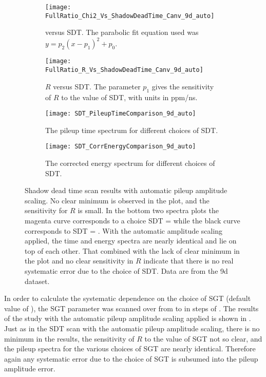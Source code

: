 \begin{figure}
\centering
    \begin{subfigure}[t]{0.45\textwidth}
        \centering
        \texttt{[image: FullRatio\_Chi2\_Vs\_ShadowDeadTime\_Canv\_9d\_auto]}
        \caption{\chisq versus SDT. The parabolic fit equation used was $y = p_{2}(x - p_{1})^{2} + p_{0}.$}
    \end{subfigure}%
    \hspace{1cm}
    \begin{subfigure}[t]{0.45\textwidth}
        \centering
        \texttt{[image: FullRatio\_R\_Vs\_ShadowDeadTime\_Canv\_9d\_auto]}
        \caption{$R$ versus SDT. The parameter $p_{1}$ gives the sensitivity of $R$ to the value of SDT, with units in ppm/ns.}
    \end{subfigure}

    \begin{subfigure}[t]{0.45\textwidth}
        \centering
        \texttt{[image: SDT\_PileupTimeComparison\_9d\_auto]}
        \caption{The pileup time spectrum for different choices of SDT.}
    \end{subfigure}%
    \hspace{1cm}
    \begin{subfigure}[t]{0.45\textwidth}
        \centering
        \texttt{[image: SDT\_CorrEnergyComparison\_9d\_auto]}
        \caption{The corrected energy spectrum for different choices of SDT.}
    \end{subfigure}
\caption[Pileup shadow dead time scan with automatic pileup amplitude scaling]{Shadow dead time scan results with automatic pileup amplitude scaling. No clear minimum is observed in the \chisq plot, and the sensitivity for $R$ is small. In the bottom two spectra plots the magenta curve corresponds to a choice SDT =  while the black curve corresponds to SDT = . With the automatic amplitude scaling applied, the time and energy spectra are nearly identical and lie on top of each other. That combined with the lack of clear minimum in the \chisq plot and no clear sensitivity in $R$ indicate that there is no real systematic error due to the choice of SDT. Data are from the 9d dataset.}
\label{fig:SDTscan_autoScaling}
\end{figure}


In order to calculate the systematic dependence on the choice of SGT (default value of ), the SGT parameter was scanned over from  to  in steps of . The results of the study with the automatic pileup amplitude scaling applied is shown in . Just as in the SDT scan with the automatic pileup amplitude scaling, there is no minimum in the \chisq results, the sensitivity of $R$ to the value of SGT not so clear, and the pileup spectra for the various choices of SGT are nearly identical. Therefore again any systematic error due to the choice of SGT is subsumed into the pileup amplitude error.


